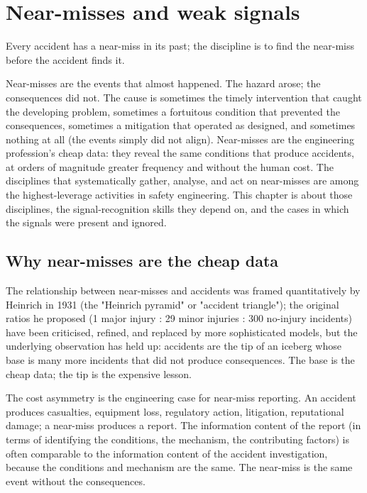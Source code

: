 \chapter{Near-misses and weak signals}
\label{vol10:ch13}

\epigraph{Every accident has a near-miss in its past; the discipline is to find the near-miss before the accident finds it.}{}


\noindent
Near-misses are the events that almost happened. The hazard arose; the consequences did not. The cause is sometimes the timely intervention that caught the developing problem, sometimes a fortuitous condition that prevented the consequences, sometimes a mitigation that operated as designed, and sometimes nothing at all (the events simply did not align). Near-misses are the engineering profession's cheap data: they reveal the same conditions that produce accidents, at orders of magnitude greater frequency and without the human cost. The disciplines that systematically gather, analyse, and act on near-misses are among the highest-leverage activities in safety engineering. This chapter is about those disciplines, the signal-recognition skills they depend on, and the cases in which the signals were present and ignored.

\section{Why near-misses are the cheap data}

The relationship between near-misses and accidents was framed quantitatively by Heinrich in 1931 (the "Heinrich pyramid" or "accident triangle"); the original ratios he proposed (1 major injury : 29 minor injuries : 300 no-injury incidents) have been criticised, refined, and replaced by more sophisticated models, but the underlying observation has held up: accidents are the tip of an iceberg whose base is many more incidents that did not produce consequences. The base is the cheap data; the tip is the expensive lesson.

The cost asymmetry is the engineering case for near-miss reporting. An accident produces casualties, equipment loss, regulatory action, litigation, reputational damage; a near-miss produces a report. The information content of the report (in terms of identifying the conditions, the mechanism, the contributing factors) is often comparable to the information content of the accident investigation, because the conditions and mechanism are the same. The near-miss is the same event without the consequences.

